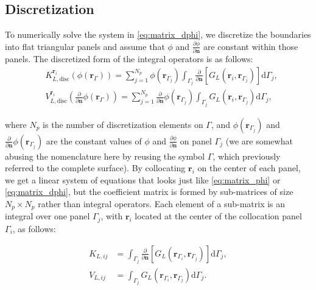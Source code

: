 

\subsection{Discretization}

To numerically solve the system in \eqref{eq:matrix_dphi}, we discretize the boundaries into flat triangular panels and assume that $\phi$ and $\frac{\partial \phi}{\partial \mathbf{n}}$ are constant within those panels. The discretized form of the integral operators is as follows:
%
\begin{align} \label{eq:layers_disc}
&K_{L,\text{disc}}^{\mathbf{r}_i}\left(\phi(\mathbf{r}_{\Gamma})\right) =  \sum_{j=1}^{N_p}\phi(\mathbf{r}_{\Gamma_j})\int_{\Gamma_j} \frac{\partial}{\partial \mathbf{n}} \left[ G_L(\mathbf{r}_{i},\mathbf{r}_{\Gamma_j}) \right]\mathrm{d} \Gamma_j,  \nonumber \\
&V_{L,\text{disc}}^{\mathbf{r}_i} \left( \frac{\partial}{\partial \mathbf{n}} \phi(\mathbf{r}_{\Gamma}) \right) = \sum_{j=1}^{N_p} \frac{\partial}{\partial \mathbf{n}} \phi(\mathbf{r}_{\Gamma_j}) \int_{\Gamma_j} G_L(\mathbf{r}_{i},\mathbf{r}_{\Gamma_j})  \mathrm{d} \Gamma_j,
\end{align}

\noindent where $N_p$ is the number of discretization elements on $\Gamma$, and $\phi(\mathbf{r}_{\Gamma_j})$ and $\frac{\partial}{\partial \mathbf{n}} \phi(\mathbf{r}_{\Gamma_j})$ are the constant values of $\phi$ and $\frac{\partial \phi}{\partial \mathbf{n}}$ on panel $\Gamma_j$ (we are somewhat abusing the nomenclature here by reusing the symbol $\Gamma$, which previously referred to the complete surface). By collocating $\mathbf{r}_i$ on the center of each panel, we get a linear system of equations that looks just like \eqref{eq:matrix_phi} or \eqref{eq:matrix_dphi}, but the coefficient matrix is formed by sub-matrices of size $N_p \times N_p$ rather than integral operators. Each element of a sub-matrix is an integral over one panel $\Gamma_j$, with $\mathbf{r}_i$ located at the center of the collocation panel $\Gamma_i$, as follows:

\begin{align} \label{eq:layers_element}
K_{L,ij} &= \int_{\Gamma_j} \frac{\partial}{\partial \mathbf{n}} \left[ G_L(\mathbf{r}_{\Gamma_i},\mathbf{r}_{\Gamma_j}) \right]\mathrm{d} \Gamma_j, \nonumber \\
V_{L,ij} &= \int_{\Gamma_j} G_L(\mathbf{r}_{\Gamma_i},\mathbf{r}_{\Gamma_j})  \mathrm{d} \Gamma_j.
\end{align}

